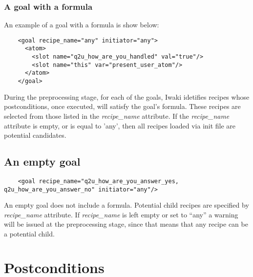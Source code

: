 \subsubsection{A goal with a formula}

An example of a goal with a formula is show below:

\lstset{language=XML}
\begin{lstlisting}
    <goal recipe_name="any" initiator="any">
      <atom>
        <slot name="q2u_how_are_you_handled" val="true"/>
        <slot name="this" var="present_user_atom"/>
      </atom>
    </goal>
\end{lstlisting}


During the preprocessing stage, for each of the goals, Iwaki idetifies recipes whose postconditions, once executed, will satisfy the goal's formula.  These recipes are selected from those listed in the \textsl{recipe\_name} attribute. If the \textsl{recipe\_name}  attribute is empty, or is equal to 'any', then all recipes loaded via init file are potential candidates.
 
\subsection{An empty goal}

\lstset{language=XML}
\begin{lstlisting}
    <goal recipe_name="q2u_how_are_you_answer_yes, q2u_how_are_you_answer_no" initiator="any"/>
\end{lstlisting}

An empty goal does not include a formula. Potential child recipes are specified by \textsl{recipe\_name} attribute. If \textsl{recipe\_name} is left empty or set to ``any'' a warning will be issued at the preprocessing stage, since that means that any recipe can be a potential child.

\section{Postconditions}

